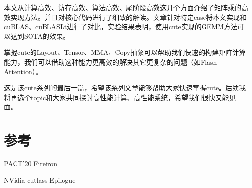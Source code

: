 本文从计算高效、访存高效、算法高效、尾阶段高效这几个方面介绍了矩阵乘的高效实现方法。并且对核心代码进行了细致的解读。文章针对特定case将本文实现和cuBLAS、cuBLASLt进行了对比，实验结果表明，使用cute实现的GEMM方法可以达到SOTA的效果。

掌握cute的Layout、Tensor、MMA、Copy抽象可以帮助我们快速的构建矩阵计算能力，我们可以借助这种能力更高效的解决其它更复杂的问题（如Flash Attention）。

这是该cute系列的最后一篇，希望该系列文章能够帮助大家快速掌握cute。后续我将再选个topic和大家共同探讨高性能计算、高性能系统，希望我们很快又能见面。

\section{参考}

PACT'20 Fireiron

NVidia cutlass Epilogue
